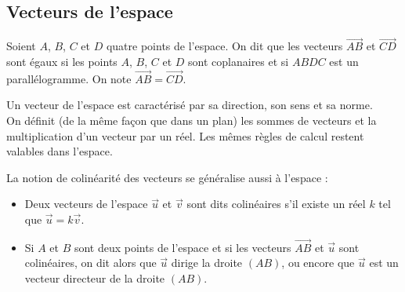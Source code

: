 \documentclass[10pt]{article}
\begin{document}

\subsection{Vecteurs de l'espace}

Soient $A$, $B$, $C$ et $D$ quatre points de l'espace. On dit que les vecteurs $\Vec{AB}$ et $\Vec{CD}$ sont égaux si
les points $A$, $B$, $C$ et $D$ sont coplanaires et si $ABDC$ est un parallélogramme. On note $\Vec{AB}=\Vec{CD}$.
\newline

Un vecteur de l'espace est caractérisé par sa direction, son sens et sa norme.\\
On définit (de la même façon que dans un plan) les sommes de vecteurs et la multiplication d'un vecteur par un réel. Les
mêmes règles de calcul restent valables dans l'espace.

La notion de colinéarité des vecteurs se généralise aussi à l'espace :
\begin{itemize}
    \item Deux vecteurs de l'espace $\vec{u}$ et $\vec{v}$ sont dits colinéaires s'il existe un réel $k$ tel que
          $\vec{u}=k\vec{v}$.
    \item Si $A$ et $B$ sont deux points de l'espace et si les vecteurs $\Vec{AB}$ et $\vec{u}$ sont colinéaires, on dit
          alors que $\vec{u}$ dirige la droite $(AB)$, ou encore que $\vec{u}$ est un vecteur directeur de la droite
          $(AB)$.
\end{itemize}
\end{document}
